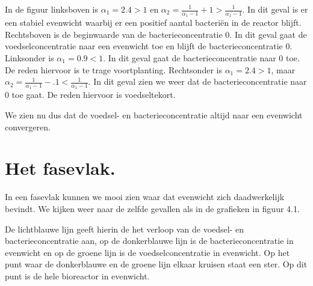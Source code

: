 In de figuur linksboven is $\alpha_1 = 2.4 > 1$ en $\alpha_2 = \frac{1}{\alpha_1-1}+1>\frac{1}{\alpha_1-1}$. In dit geval is er een stabiel evenwicht waarbij er een positief aantal bacteri\"en in de reactor blijft.
Rechtsboven is de beginwaarde van de bacterieconcentratie 0. In dit geval gaat de voedselconcentratie naar een evenwicht toe en blijft de bacterieconcentratie 0.
Linksonder is $\alpha_1 = 0.9 < 1$. In dit geval gaat de bacterieconcentratie naar 0 toe. De reden hiervoor is te trage voortplanting.
Rechtsonder is $\alpha_1 = 2.4 > 1$, maar $\alpha_2 = \frac{1}{\alpha_1-1}-.1<\frac{1}{\alpha_1-1}$. In dit geval zien we weer dat de bacterieconcentratie naar 0 toe gaat. De reden hiervoor is voedseltekort.

We zien nu dus dat de voedsel- en bacterieconcentratie altijd naar een evenwicht convergeren.

\section{Het fasevlak.}

In een fasevlak kunnen we mooi zien waar dat evenwicht zich daadwerkelijk bevindt. We kijken weer naar de zelfde gevallen als in de grafieken in figuur 4.1.

De lichtblauwe lijn geeft hierin de het verloop van de voedsel- en bacterieconcentratie aan, op de donkerblauwe lijn is de bacterieconcentratie in evenwicht en op de groene lijn is de voedselconcentratie in evenwicht. Op het punt waar de donkerblauwe en de groene lijn elkaar kruisen staat een ster. Op dit punt is de hele bioreactor in evenwicht.

